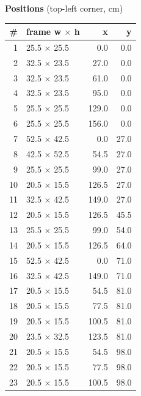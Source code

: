 \documentclass[a4paper,landscape,10pt]{article}
\begin{document}
\begin{minipage}[t]{0.25\textwidth}
\vspace{8pt}
{\bfseries Positions} (top-left corner, cm)\\[2pt]
\tiny
\begin{tabular}{@{}r l r r@{}}
\toprule
\# & frame w $\times$ h & x & y \\
\midrule
1 & 25.5 $\times$ 25.5 & 0.0 & 0.0 \\
2 & 32.5 $\times$ 23.5 & 27.0 & 0.0 \\
3 & 32.5 $\times$ 23.5 & 61.0 & 0.0 \\
4 & 32.5 $\times$ 23.5 & 95.0 & 0.0 \\
5 & 25.5 $\times$ 25.5 & 129.0 & 0.0 \\
6 & 25.5 $\times$ 25.5 & 156.0 & 0.0 \\
7 & 52.5 $\times$ 42.5 & 0.0 & 27.0 \\
8 & 42.5 $\times$ 52.5 & 54.5 & 27.0 \\
9 & 25.5 $\times$ 25.5 & 99.0 & 27.0 \\
10 & 20.5 $\times$ 15.5 & 126.5 & 27.0 \\
11 & 32.5 $\times$ 42.5 & 149.0 & 27.0 \\
12 & 20.5 $\times$ 15.5 & 126.5 & 45.5 \\
13 & 25.5 $\times$ 25.5 & 99.0 & 54.0 \\
14 & 20.5 $\times$ 15.5 & 126.5 & 64.0 \\
15 & 52.5 $\times$ 42.5 & 0.0 & 71.0 \\
16 & 32.5 $\times$ 42.5 & 149.0 & 71.0 \\
17 & 20.5 $\times$ 15.5 & 54.5 & 81.0 \\
18 & 20.5 $\times$ 15.5 & 77.5 & 81.0 \\
19 & 20.5 $\times$ 15.5 & 100.5 & 81.0 \\
20 & 23.5 $\times$ 32.5 & 123.5 & 81.0 \\
21 & 20.5 $\times$ 15.5 & 54.5 & 98.0 \\
22 & 20.5 $\times$ 15.5 & 77.5 & 98.0 \\
23 & 20.5 $\times$ 15.5 & 100.5 & 98.0 \\
\bottomrule
\end{tabular}
\end{minipage}
\clearpage
\end{document}

